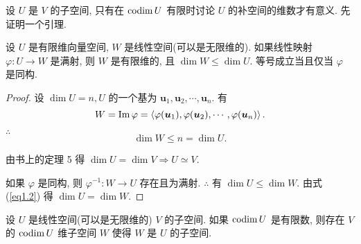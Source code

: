 \documentclass[color=black,device=normal,lang=cn,mode=geye]{elegantnote}
\begin{document}
设 $U$ 是 $V$ 的子空间, 只有在 $\operatorname{codim} U$ 有限时讨论 $U$ 的补空间的维数才有意义. 先证明一个引理.
\begin{lemma}\label{l1.1}
    设 $U$ 是有限维向量空间, $W$ 是线性空间(可以是无限维的). 如果线性映射 $\varphi:U\to W$ 是满射, 则 $W$ 是有限维的, 且 $\dim W\leq\dim U$. 等号成立当且仅当 $\varphi$ 是同构.
\end{lemma}
\begin{proof}
    设 $\dim U=n,U$ 的一个基为 $\boldsymbol{u}_1,\boldsymbol{u}_2,\cdots,\boldsymbol{u}_n$. 有
    \[W=\operatorname{Im}\varphi=\left<\varphi(\boldsymbol{u}_1),\varphi(\boldsymbol{u}_2),\cdots,\varphi(\boldsymbol{u}_n)\right>.\]

    $\therefore$
    \begin{equation}\label{eq1.2}
        \dim W\leq n=\dim U.
    \end{equation}

    由书上的定理 5 得 $\dim U=\dim V\Rightarrow U\simeq V$.
    
    如果 $\varphi$ 是同构, 则 $\varphi^{-1}:W\to U$ 存在且为满射. $\therefore$ 有 $\dim U\leq\dim W$. 由式 (\ref{eq1.2}) 得 $\dim U=\dim W$.
\end{proof}
\begin{theorem}\label{t1.7}
    设 $U$ 是线性空间(可以是无限维的) $V$ 的子空间. 如果 $\operatorname{codim} U$ 是有限数, 则存在 $V$ 的 $\operatorname{codim} U$ 维子空间 $W$ 使得 $W$ 是 $U$ 的子空间.
\end{theorem}
\end{document}

